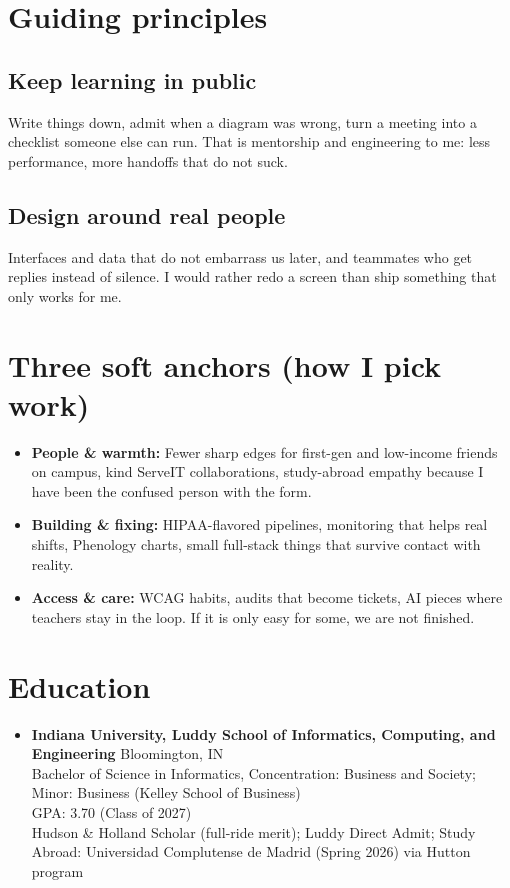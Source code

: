 \documentclass[11pt]{article}
\begin{document}
\section*{Guiding principles}

\subsection*{Keep learning in public}
Write things down, admit when a diagram was wrong, turn a meeting into a checklist someone else can run. That is mentorship and engineering to me: less performance, more handoffs that do not suck.

\subsection*{Design around real people}
Interfaces and data that do not embarrass us later, and teammates who get replies instead of silence. I would rather redo a screen than ship something that only works for me.

\section*{Three soft anchors (how I pick work)}

\begin{itemize}[leftmargin=*]
    \item \textbf{People \& warmth:} Fewer sharp edges for first-gen and low-income friends on campus, kind ServeIT collaborations, study-abroad empathy because I have been the confused person with the form.
    \item \textbf{Building \& fixing:} HIPAA-flavored pipelines, monitoring that helps real shifts, Phenology charts, small full-stack things that survive contact with reality.
    \item \textbf{Access \& care:} WCAG habits, audits that become tickets, AI pieces where teachers stay in the loop. If it is only easy for some, we are not finished.
\end{itemize}

\section*{Education}
\begin{itemize}[leftmargin=*]
    \item \textbf{Indiana University, Luddy School of Informatics, Computing, and Engineering} Bloomington, IN\\
    Bachelor of Science in Informatics, Concentration: Business and Society; Minor: Business (Kelley School of Business)\\
    GPA: 3.70 (Class of 2027)\\
    Hudson \& Holland Scholar (full-ride merit); Luddy Direct Admit; Study Abroad: Universidad Complutense de Madrid (Spring 2026) via Hutton program
 \end{itemize}
\end{document}
